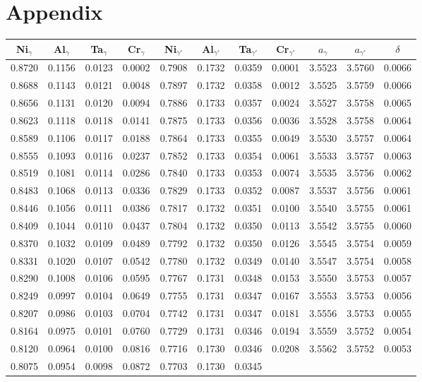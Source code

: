 \section{Appendix}
\label{appendix}

\begin{table}[H]
    \centering
    \begin{tabular}{rrrrrrrrrrr}
        \multicolumn{1}{c}{Ni$_\gamma$} & \multicolumn{1}{c}{Al$_\gamma$} & \multicolumn{1}{c}{Ta$_\gamma$} & \multicolumn{1}{c}{Cr$_\gamma$} & \multicolumn{1}{c}{Ni$_{\gamma'}$} & \multicolumn{1}{c}{Al$_{\gamma'}$} & \multicolumn{1}{c}{Ta$_{\gamma'}$} & \multicolumn{1}{c}{Cr$_{\gamma'}$} & \multicolumn{1}{c}{$a_\gamma$} & \multicolumn{1}{c}{$a_{\gamma'}$} & \multicolumn{1}{c}{$\delta$} \\ \hline \hline
        0.8720 & 0.1156 & 0.0123 & 0.0002 & 0.7908 & 0.1732 & 0.0359 & 0.0001 & 3.5523 & 3.5760 & 0.0066 \\0.8688 & 0.1143 & 0.0121 & 0.0048 & 0.7897 & 0.1732 & 0.0358 & 0.0012 & 3.5525 & 3.5759 & 0.0066 \\0.8656 & 0.1131 & 0.0120 & 0.0094 & 0.7886 & 0.1733 & 0.0357 & 0.0024 & 3.5527 & 3.5758 & 0.0065 \\0.8623 & 0.1118 & 0.0118 & 0.0141 & 0.7875 & 0.1733 & 0.0356 & 0.0036 & 3.5528 & 3.5758 & 0.0064 \\0.8589 & 0.1106 & 0.0117 & 0.0188 & 0.7864 & 0.1733 & 0.0355 & 0.0049 & 3.5530 & 3.5757 & 0.0064 \\0.8555 & 0.1093 & 0.0116 & 0.0237 & 0.7852 & 0.1733 & 0.0354 & 0.0061 & 3.5533 & 3.5757 & 0.0063 \\0.8519 & 0.1081 & 0.0114 & 0.0286 & 0.7840 & 0.1733 & 0.0353 & 0.0074 & 3.5535 & 3.5756 & 0.0062 \\0.8483 & 0.1068 & 0.0113 & 0.0336 & 0.7829 & 0.1733 & 0.0352 & 0.0087 & 3.5537 & 3.5756 & 0.0061 \\0.8446 & 0.1056 & 0.0111 & 0.0386 & 0.7817 & 0.1732 & 0.0351 & 0.0100 & 3.5540 & 3.5755 & 0.0061 \\0.8409 & 0.1044 & 0.0110 & 0.0437 & 0.7804 & 0.1732 & 0.0350 & 0.0113 & 3.5542 & 3.5755 & 0.0060 \\0.8370 & 0.1032 & 0.0109 & 0.0489 & 0.7792 & 0.1732 & 0.0350 & 0.0126 & 3.5545 & 3.5754 & 0.0059 \\0.8331 & 0.1020 & 0.0107 & 0.0542 & 0.7780 & 0.1732 & 0.0349 & 0.0140 & 3.5547 & 3.5754 & 0.0058 \\0.8290 & 0.1008 & 0.0106 & 0.0595 & 0.7767 & 0.1731 & 0.0348 & 0.0153 & 3.5550 & 3.5753 & 0.0057 \\0.8249 & 0.0997 & 0.0104 & 0.0649 & 0.7755 & 0.1731 & 0.0347 & 0.0167 & 3.5553 & 3.5753 & 0.0056 \\0.8207 & 0.0986 & 0.0103 & 0.0704 & 0.7742 & 0.1731 & 0.0347 & 0.0181 & 3.5556 & 3.5753 & 0.0055 \\0.8164 & 0.0975 & 0.0101 & 0.0760 & 0.7729 & 0.1731 & 0.0346 & 0.0194 & 3.5559 & 3.5752 & 0.0054 \\0.8120 & 0.0964 & 0.0100 & 0.0816 & 0.7716 & 0.1730 & 0.0346 & 0.0208 & 3.5562 & 3.5752 & 0.0053 \\0.8075 & 0.0954 & 0.0098 & 0.0872 & 0.7703 & 0.1730 & 0.0345 & 
\end{tabular}
\end{table}
